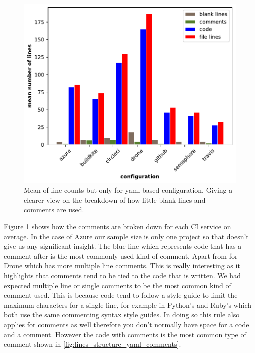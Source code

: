 \documentclass[10pt,conference]{IEEEtran}
\begin{document}
\begin{figure}[!ht]
  \centering
  \includegraphics[width=\textwidth]{../src/results/line structure yaml.pdf}
  \caption[alt text]{Mean of line counts but only for yaml based configuration. Giving a clearer view on the breakdown of how little blank lines and comments are used.}
  \label{fig:lines_structure_yaml}
\end{figure}

Figure \ref{fig:lines_structure_yaml} shows how the comments are broken down for each CI service on average. In the case of Azure our sample size is only one project so that doesn't give us any significant insight.
The blue line which represents code that has a comment after is the most commonly used kind of comment. Apart from for Drone which has more multiple line comments. This is really interesting as it highlights that comments tend to be tied to the code that is written. We had expected multiple line or single comments to be the most common kind of comment used. This is because code tend to follow a style guide to limit the maximum characters for a single line, for example in Python's \citet{PEP8} and Ruby's \citet{RUBY2020} which both use the same commenting syntax style guides. In doing so this rule also applies for comments as well therefore you don't normally have space for a code and a comment. However the code with comments is the most common type of comment shown in \ref{fig:lines_structure_yaml_comments}.
\end{document}
